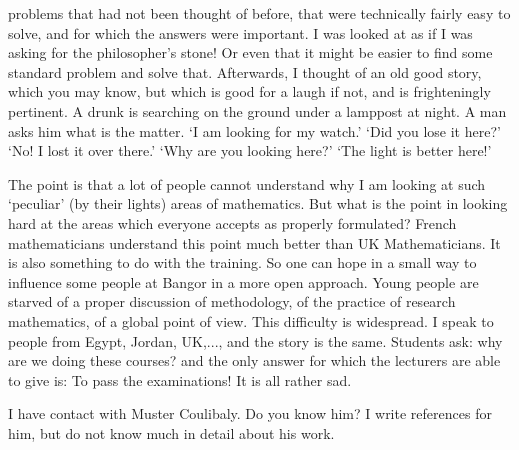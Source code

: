 problems that had not been thought of before, that were technically fairly
easy to solve, and for which the answers were important. I was looked at as
if I was asking for the philosopher's stone! Or even that it might be
easier to find some standard problem and solve that. Afterwards, I thought
of an old good story, which you may know, but which is good for a laugh if
not, and is frighteningly pertinent. A drunk is searching on the ground
under a lamppost at night. A man asks him what is the matter. `I am
looking for my watch.' `Did you lose it here?' `No! I lost it over
there.' `Why are you looking here?' `The light is better here!'

The point is that a lot of people cannot understand why I am looking at
such `peculiar' (by their lights) areas of mathematics. But what is the
point in looking hard at the areas which everyone accepts as properly
formulated? French mathematicians understand this point much better than UK
Mathematicians. It is also something to do with the training. So one can
hope in a small way to influence some people at Bangor in a more open
approach. Young people are starved of a proper discussion of methodology,
of the practice of research mathematics, of a global point of view. This
difficulty is widespread. I speak to people from Egypt, Jordan, UK,..., and
the story is the same. Students ask: why are we doing these courses? and
the only answer for which the lecturers are able to give is: To pass the
examinations! It is all rather sad.

I have contact with Muster Coulibaly. Do you know him? I write
references for him, but do not know much in detail about his work.

 \hfill {}

\hfill {}


